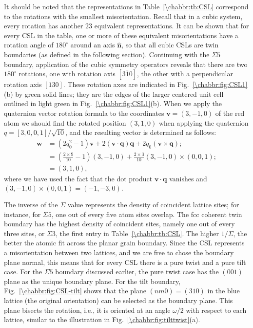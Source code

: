 It should be noted that the representations in Table~\ref{\chabbr:tb:CSL} correspond to the rotations with the smallest misorientation. Recall that in a cubic system, every rotation has another $23$ equivalent representations.  It can be shown that for every CSL in the table, one or more of these equivalent misorientations have a rotation angle of $180^{\circ}$ around an axis $\hat{\mathbf{n}}$, so that all cubic CSLs are twin boundaries (as defined in the following section).  Continuing with the $\Sigma 5$ boundary, application of the cubic symmetry operators reveals that there are two $180^{\circ}$ rotations, one with rotation axis $[3\bar{1}0]$, the other with a perpendicular rotation axis $[130]$. These rotation axes are indicated in Fig.~\ref{\chabbr:fig:CSL1}(b) by green solid lines; they are the edges of the larger centered unit cell outlined in light green in Fig.~\ref{\chabbr:fig:CSL1}(b).  When we apply the quaternion vector rotation formula  to the coordinates $\mathbf{v}=(3,-1,0)$ of the red atom we should find the rotated position $(3,1,0)$ when applying the quaternion $q=[3,0,0,1]/\sqrt{10}$, and the resulting vector is determined as follows:
\begin{align*}
	\mathbf{w} &= (2q_0^2-1)\mathbf{v}+2(\mathbf{v}\cdot\mathbf{q})\mathbf{q}+2q_0(\mathbf{v}\times\mathbf{q});\\
	                  &= (\frac{2\times 9}{10}-1)(3,-1,0) +\frac{2\times 3}{10} (3,-1,0)\times(0,0,1);\\
	                  &= (3,1,0),
\end{align*}
where we have used the fact that the dot product $\mathbf{v}\cdot\mathbf{q}$ vanishes and $(3,-1,0)\times(0,0,1)=(-1,-3,0)$.

The inverse of the $\Sigma$ value represents the density of coincident lattice sites; for instance, for $\Sigma 5$, one out of every five atom sites overlap. The fcc coherent twin boundary has the highest density of coincident sites, namely one out of every three sites, or $\Sigma 3$, the first entry in Table~\ref{\chabbr:tb:CSL}.  The higher $1/\Sigma$, the better the atomic fit across the planar grain boundary.  Since the CSL represents a misorientation between two lattices, and we are free to chose the boundary plane normal, this means that for every CSL there is a pure twist and a pure tilt case.  For the $\Sigma 5$ boundary discussed earlier, the pure twist case has the $(001)$ plane as the unique boundary plane. For the tilt boundary, Fig.~\ref{\chabbr:fig:CSL-tilt} shows that the plane $(nm0)=(310)$ in the blue lattice (the original orientation) can be selected as the boundary plane.  This plane bisects the rotation, i.e., it is oriented at an angle $\omega/2$ with respect to each lattice, similar to the illustration in Fig.~\ref{\chabbr:fig:tilttwist}(a).

